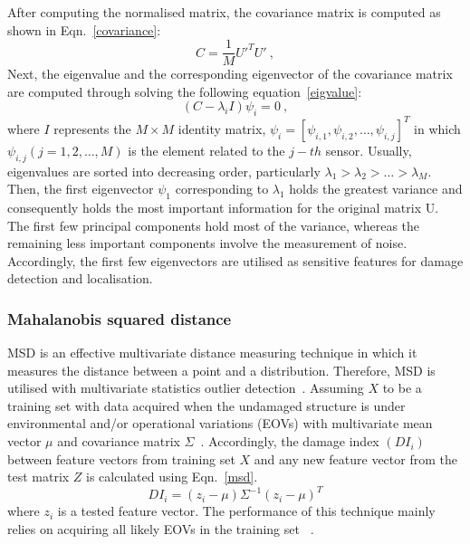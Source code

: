 After computing the normalised matrix, the covariance matrix is computed as shown in Eqn.~\ref{covariance}:
\begin{equation}
	C = \frac{1}{M}U'^TU' \ ,
	\label{covariance}
\end{equation}
Next, the eigenvalue and the corresponding eigenvector of the covariance matrix are computed through solving the following equation~\ref{eigvalue}:
\begin{equation}
	(C-\lambda_iI)\psi_i =0 \ ,
	\label{eigvalue}
\end{equation}
where \(I\) represents the \(M\times M\) identity matrix, \(\psi_i = [\psi_{i,1},\psi_{i,2}, \hdots, \psi_{i,j}]^T\) in which \(\psi_{i,j}(j=1, 2, \hdots, M)\) is the element related to the \(j-th\) sensor.
Usually, eigenvalues are sorted into decreasing order, particularly \(\lambda_1>\lambda_2>\hdots>\lambda_M\). 
Then, the first eigenvector \(\psi_1\) corresponding to \(\lambda_1\) holds the greatest variance and consequently holds the most important information for the original matrix U. 
The first few principal components hold most of the variance, whereas the remaining less important components involve the measurement of noise.
Accordingly, the first few eigenvectors are utilised as sensitive features for damage detection and localisation.
\subsubsection{Mahalanobis squared distance}
MSD is an effective multivariate distance measuring technique in which it measures the distance between a point and a distribution.
Therefore, MSD is utilised with multivariate statistics outlier detection~\cite{Worden2000}.
Assuming \(X\) to be a training set with data acquired when the undamaged structure is under environmental and/or operational variations (EOVs) with multivariate mean vector \(\mu\) and covariance matrix \(\Sigma\)~\cite{Farrar2013}.
Accordingly, the damage index \((DI_i)\) between feature vectors from training set \(X\) and any new feature vector from the test matrix \(Z\) is calculated using Eqn.~\ref{msd}.
\begin{equation}
	DI_i = (z_i-\mu)\Sigma^{-1}(z_i-\mu)^T
	\label{msd}
\end{equation}
where \(z_i\) is a tested feature vector.
The performance of this technique mainly relies on acquiring all likely EOVs in the training set~
\cite{Farrar2013}.
